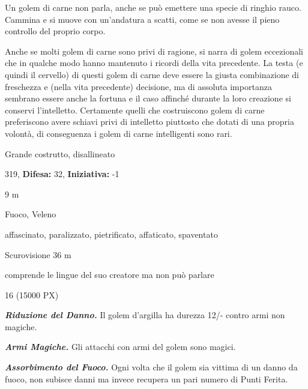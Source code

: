 \begin{multicols}{2}
{Un golem di carne non parla, anche se può emettere una specie di ringhio rauco. Cammina e si muove con un'andatura a scatti, come se non avesse il pieno controllo del proprio corpo.

Anche se molti golem di carne sono privi di ragione, si narra di golem eccezionali che in qualche modo hanno mantenuto i ricordi della vita precedente. La testa (e quindi il cervello) di questi golem di carne deve essere la giusta combinazione di freschezza e (nella vita precedente) decisione, ma di assoluta importanza sembrano essere anche la fortuna e il caso affinché durante la loro creazione si conservi l'intelletto. Certamente quelli che costruiscono golem di carne preferiscono avere schiavi privi di intelletto piuttosto che dotati di una propria volontà, di conseguenza i golem di carne intelligenti sono rari.

\noindent
\begin{description}[noitemsep, topsep=0pt, parsep=0pt, partopsep=0pt, leftmargin=0cm, labelwidth=2.2cm]
	\item[\textbf{Taglia/Tipo:}] Grande costrutto, disallineato
	\item[\textbf{Caratt.:}] 
	\item[\textbf{Punti Ferita:}] 319,  \textbf{Difesa:} 32,  \textbf{Iniziativa:} -1
	\item[\textbf{Movimento:}] 9 m
	\item[\textbf{Tiri Salvez.:}] 
	\item[\textbf{Imm. Danni:}] Fuoco, Veleno
	\item[\textbf{Immunità:}] affascinato, paralizzato, pietrificato, affaticato, spaventato
	\item[\textbf{Sensi:}] Scurovisione 36 m
	\item[\textbf{Linguaggi:}] comprende le lingue del suo creatore ma non può parlare
	\item[\textbf{Sfida:}] 16 (15000 PX)\smallskip
\end{description}

\emph{\textbf{Riduzione del Danno.}} Il golem d'argilla ha durezza 12/- contro armi non magiche.

\emph{\textbf{Armi Magiche.}} Gli attacchi con armi del golem sono magici.

\emph{\textbf{Assorbimento del Fuoco.}} Ogni volta che il golem sia vittima di un danno da fuoco, non subisce danni ma invece recupera un pari numero di Punti Ferita.

}
\end{multicols}
